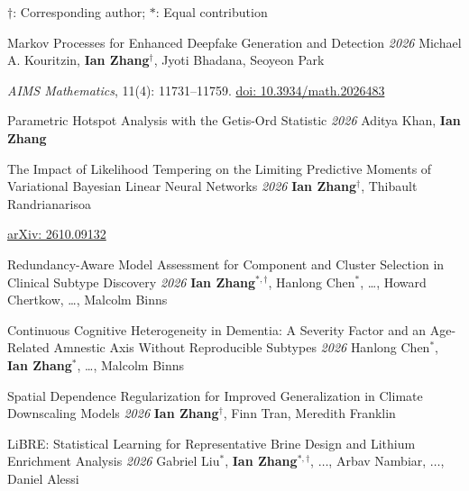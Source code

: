 \vspace*{10pt}
{\small $\dagger$: Corresponding author;
\quad $*$: Equal contribution\par}


\pubentry
{Markov Processes for Enhanced Deepfake Generation and Detection}
{\normalfont\itshape 2026}
{Michael A. Kouritzin, \textbf{Ian Zhang}$^{\dagger}$,
Jyoti Bhadana, Seoyeon Park}

\nobreak\vspace{2pt}
\noindent
\textit{AIMS Mathematics}, 11(4): 11731--11759.
\href{https://doi.org/10.3934/math.2026483}
{doi: 10.3934/math.2026483}
\par


\pubentry
{Parametric Hotspot Analysis with the Getis-Ord Statistic}
{\normalfont\itshape 2026}
{Aditya Khan, \textbf{Ian Zhang}}


\pubentry
{The Impact of Likelihood Tempering on the Limiting Predictive Moments
of Variational Bayesian Linear Neural Networks}
{\normalfont\itshape 2026}
{\textbf{Ian Zhang}$^{\dagger}$, Thibault Randrianarisoa}

\nobreak\vspace{2pt}
\noindent
\href{https://arxiv.org/abs/2610.09132}
{arXiv: 2610.09132}
\par


\pubentry
{Redundancy-Aware Model Assessment for Component and
Cluster Selection in Clinical Subtype Discovery}
{\normalfont\itshape 2026}
{\textbf{Ian Zhang}$^{*,\dagger}$, Hanlong Chen$^{*}$,
\ldots, Howard Chertkow, \ldots, Malcolm Binns}

\pubentry
{Continuous Cognitive Heterogeneity in Dementia:
A Severity Factor and an Age-Related Amnestic Axis
Without Reproducible Subtypes}
{\normalfont\itshape 2026}
{Hanlong Chen$^{*}$, \textbf{Ian Zhang}$^{*}$,
\ldots, Malcolm Binns}

\pubentry
{Spatial Dependence Regularization for Improved
Generalization in Climate Downscaling Models}
{\normalfont\itshape 2026}
{\textbf{Ian Zhang}$^{\dagger}$, Finn Tran,
Meredith Franklin}

\pubentry
{LiBRE: Statistical Learning for Representative Brine
Design and Lithium Enrichment Analysis}
{\normalfont\itshape 2026}
{Gabriel Liu$^{*}$, \textbf{Ian Zhang}$^{*,\dagger}$, $\ldots$, Arbav Nambiar, 
$\ldots$, Daniel Alessi}
